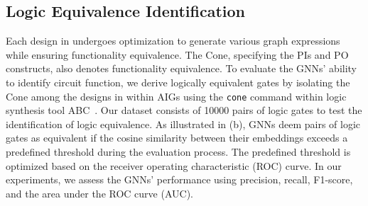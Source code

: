 \subsection{Logic Equivalence Identification}
Each design in  undergoes optimization to generate various graph expressions while ensuring functionality equivalence. 
The Cone, specifying the PIs and PO constructs, also denotes functionality equivalence. 
To evaluate the GNNs' ability to identify circuit function, we derive logically equivalent gates by isolating the Cone among the designs in  within AIGs using the \texttt{cone} command within logic synthesis tool ABC~\citep{brayton2010abc}.
Our dataset consists of 10000 pairs of logic gates to test the identification of logic equivalence.
As illustrated in (b), GNNs deem pairs of logic gates as equivalent if the cosine similarity between their embeddings exceeds a predefined threshold during the evaluation process.
The predefined threshold is optimized based on the receiver operating characteristic (ROC) curve. 
In our experiments, we assess the GNNs' performance using precision, recall, F1-score, and the area under the ROC curve (AUC).

\begin{table*}[tb!]
\caption{Performance of DeepGate2 and MGVGA on logic equivalence identification.}
\centering
\label{table:logiceq}
\end{table*}

